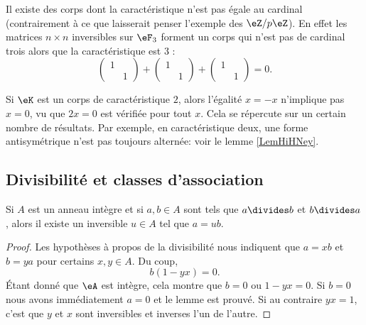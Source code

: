 \begin{example}
    Il existe des corps dont la caractéristique n'est pas égale au cardinal (contrairement à ce que laisserait penser l'exemple des \( \eZ/p\eZ\)). En effet les matrices \( n\times n\) inversibles sur \( \eF_{3}\) forment un corps qui n'est pas de cardinal trois alors que la caractéristique est \( 3\) :
    \begin{equation}
        \begin{pmatrix}
            1    &       \\ 
                &   1    
            \end{pmatrix}+\begin{pmatrix}
                1    &       \\ 
                    &   1    
                \end{pmatrix}+\begin{pmatrix}
                    1    &       \\ 
                        &   1    
                \end{pmatrix}=0.
    \end{equation}
\end{example}

\begin{example}
    Si \( \eK\) est un corps de caractéristique \( 2\), alors l'égalité \( x=-x\) n'implique pas \( x=0\), vu que \( 2x=0\) est vérifiée pour tout \( x\). Cela se répercute sur un certain nombre de résultats. Par exemple, en caractéristique deux, une forme antisymétrique n'est pas toujours alternée: voir le lemme \ref{LemHiHNey}.
\end{example}

\subsection{Divisibilité et classes d'association}

\begin{lemma}\label{LemRmVTRq}
    Si \( A\) est un anneau intègre et si \( a,b\in A\) sont tels que \( a\divides b\) et \( b\divides a\), alors il existe un inversible \( u\in A\) tel que \( a=ub\).
\end{lemma}

\begin{proof}
    Les hypothèses à propos de la divisibilité nous indiquent que \( a=xb\) et \( b=ya\) pour certains \( x,y\in A\). Du coup,
    \begin{equation}
        b(1-yx)=0.
    \end{equation}
    Étant donné que \( \eA\) est intègre, cela montre que \( b=0\) ou \( 1-yx=0\). Si \( b=0\) nous avons immédiatement \( a=0\) et le lemme est prouvé. Si au contraire \( yx=1\), c'est que \( y\) et \( x\) sont inversibles et inverses l'un de l'autre.
\end{proof}

